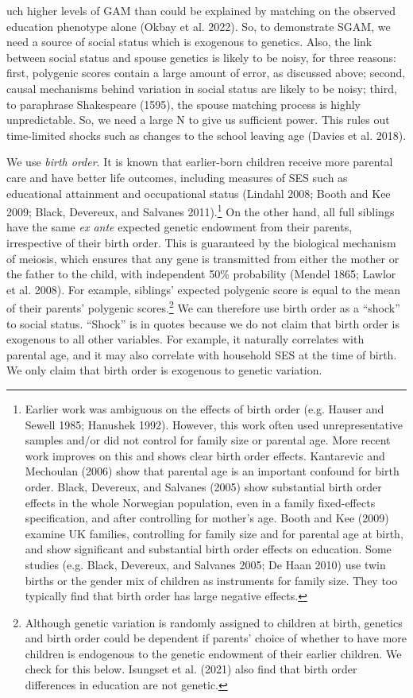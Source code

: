 \documentclass[
  12pt,
]{article}
\theoremstyle{definition}
\theoremstyle{definition}
\theoremstyle{definition}
\theoremstyle{definition}
\theoremstyle{remark}
\begin{document}
uch
higher levels of GAM than could be explained by matching on the observed
education phenotype alone (Okbay et al. 2022). So, to demonstrate SGAM, we need
a source of social status which is exogenous to genetics. Also, the link
between social status and spouse genetics is likely to be noisy, for
three reasons: first, polygenic scores contain a large amount of error, as
discussed above; second, causal mechanisms behind variation in social status
are likely to be noisy; third, to paraphrase Shakespeare (1595), the
spouse matching process is highly unpredictable. So, we need a large N to
give us sufficient power. This rules out time-limited shocks such as
changes to the school leaving age (Davies et al. 2018).

We use \emph{birth order}. It is known that earlier-born children receive more
parental care and have better life outcomes, including measures of SES such as
educational attainment and occupational status (Lindahl 2008; Booth and Kee 2009; Black, Devereux, and Salvanes 2011).\footnote{Earlier work was ambiguous on the effects of birth order
  (e.g. Hauser and Sewell 1985; Hanushek 1992). However, this work often used
  unrepresentative samples and/or did not control for family size or parental age.
  More recent work improves on this and shows clear birth order effects.
  Kantarevic and Mechoulan (2006) show that parental age is an important confound for birth
  order. Black, Devereux, and Salvanes (2005) show substantial birth order effects in the whole Norwegian
  population, even in a family fixed-effects specification, and after controlling
  for mother's age. Booth and Kee (2009) examine UK families, controlling for family
  size and for parental age at birth, and show significant and substantial birth
  order effects on education. Some studies (e.g. Black, Devereux, and Salvanes 2005; De Haan 2010) use
  twin births or the gender mix of children as instruments for family size. They
  too typically find that birth order has large negative effects.} On the other hand, all full siblings have the
same \emph{ex ante} expected genetic endowment from their parents, irrespective of
their birth order. This is guaranteed by the biological mechanism of meiosis,
which ensures that any gene is transmitted from either the mother or the father
to the child, with independent 50\% probability
(Mendel 1865; Lawlor et al. 2008). For example, siblings' expected
polygenic score is equal to the mean of their parents' polygenic scores.\footnote{Although genetic variation is randomly assigned to children at
  birth, genetics and birth order could be dependent if parents'
  choice of whether to have more children is endogenous to the genetic
  endowment of their earlier children. We check for this below.
  Isungset et al. (2021) also find that birth order differences in education are
  not genetic.}
We can therefore use birth order as a ``shock'' to social status. ``Shock'' is in
quotes because we do not claim that birth order is exogenous to all other
variables. For example, it naturally correlates with parental age, and it may
also correlate with household SES at the time of birth. We only claim that birth
order is exogenous to genetic variation.
\end{document}
